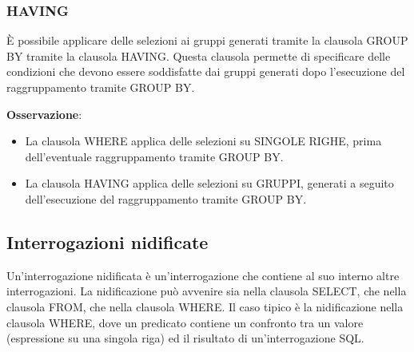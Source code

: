 \documentclass[a4paper]{article}
\begin{document}
\subsubsection{HAVING}
È possibile applicare delle selezioni ai gruppi generati tramite la clausola GROUP BY
tramite la clausola HAVING. Questa clausola permette di specificare delle condizioni che
devono essere soddisfatte dai gruppi generati dopo l’esecuzione
del raggruppamento tramite GROUP BY.

\vspace{1em}
\noindent
\textbf{Osservazione}:
\begin{itemize}
  \item La clausola WHERE applica delle selezioni su SINGOLE RIGHE, prima dell’eventuale
    raggruppamento tramite GROUP BY.

  \item La clausola HAVING applica delle selezioni su GRUPPI, generati a seguito dell’esecuzione del
    raggruppamento tramite GROUP BY.
\end{itemize}

\subsection{Interrogazioni nidificate}
Un'interrogazione nidificata è un'interrogazione che contiene al suo interno altre
interrogazioni. La nidificazione può avvenire sia nella clausola SELECT, che nella
clausola FROM, che nella clausola WHERE. Il caso tipico è la nidificazione nella clausola
WHERE, dove un predicato contiene un confronto tra un valore (espressione su una singola
riga) ed il risultato di un’interrogazione SQL.
\end{document}
